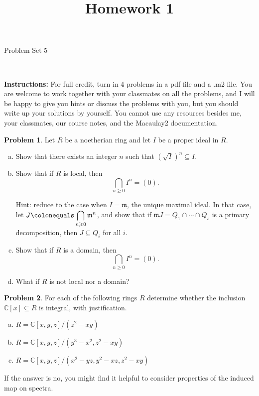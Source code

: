 \documentclass[11pt]{article}
\title{}
\date{\vspace{-0.5in}}
\title{Homework 1}
\newcommand{\m}{\mathfrak{m}}
\newcommand{\C}{\mathbb{C}}
\theoremstyle{definition}
\newtheorem{problem}{Problem}
\begin{document}
\thispagestyle{fancy}
\pagestyle{fancy}

\vspace{3em}

\begin{center}
	{\LARGE Problem Set 5}
\end{center}

\

\noindent
{\bf Instructions:}
For full credit, turn in 4 problems in a pdf file and a .m2 file. 
You are welcome to work together with your classmates on all the problems, and I will be happy to give you hints or discuss the problems with you, but you should write up your solutions by yourself.
You cannot use any resources besides me, your classmates, our course notes, and the Macaulay2 documentation.


\vspace{2em}


\begin{problem}
	Let $R$ be a noetherian ring and let $I$ be a proper ideal in $R$.
	\begin{enumerate}[a)]
		\item Show that there exists an integer $n$ such that $(\sqrt{I})^n \subseteq I$.
		\item Show that if $R$ is local, then
		$$\bigcap_{n \geqslant 0} I^n = (0).$$
		
		\noindent
		Hint: reduce to the case when $I = \m$, the unique maximal ideal. In that case, let $J \colonequals \displaystyle\bigcap_{n\geqslant 0} \m^n$, and show that if $\m J = Q_1 \cap \cdots \cap Q_s$ is a primary decomposition, then $J \subseteq Q_i$ for all $i$.
		
		\item Show that if $R$ is a domain, then
		$$\bigcap_{n \geqslant 0} I^n = (0).$$
		\item What if $R$ is not local nor a domain?
	\end{enumerate}
\end{problem}



\vfill



\begin{problem}
For each of the following rings $R$ determine whether the inclusion $\C[x] \subseteq R$ is integral, with justification. 
\begin{enumerate}[a)]
\item $R=\C[x,y,z]/(z^2-xy)$
\item $R=\C[x,y,z]/(y^3-x^2, z^2-xy)$
\item $R=\C[x,y,z]/(x^2-yz, y^2-xz, z^2-xy)$
\end{enumerate}
If the answer is no, you might find it helpful to consider properties of the induced map on spectra.
\end{problem}
\end{document}
